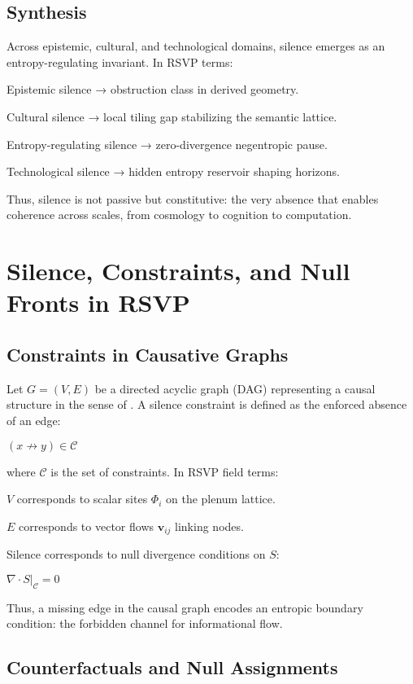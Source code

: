 \documentclass{article}
\begin{document}
\subsection{Synthesis}

Across epistemic, cultural, and technological domains, silence emerges as an entropy-regulating invariant. In RSVP terms:

Epistemic silence → obstruction class in derived geometry.

Cultural silence → local tiling gap stabilizing the semantic lattice.

Entropy-regulating silence → zero-divergence negentropic pause.

Technological silence → hidden entropy reservoir shaping horizons.

Thus, silence is not passive but constitutive: the very absence that enables coherence across scales, from cosmology to cognition to computation.

\section{Silence, Constraints, and Null Fronts in RSVP} \label{app:B}

\subsection{Constraints in Causative Graphs}

Let $G = (V,E)$ be a directed acyclic graph (DAG) representing a causal structure in the sense of \citet{Pearl2009}. A silence constraint is defined as the enforced absence of an edge:

$(x \not\to y) \in \mathcal{C}$

where $\mathcal{C}$ is the set of constraints. In RSVP field terms:

$V$ corresponds to scalar sites $\Phi_i$ on the plenum lattice.

$E$ corresponds to vector flows $\mathbf{v}_{ij}$ linking nodes.

Silence corresponds to null divergence conditions on $S$:

$\nabla \cdot S|_{\mathcal{C}} = 0$

Thus, a missing edge in the causal graph encodes an entropic boundary condition: the forbidden channel for informational flow.

\subsection{Counterfactuals and Null Assignments}
\end{document}
